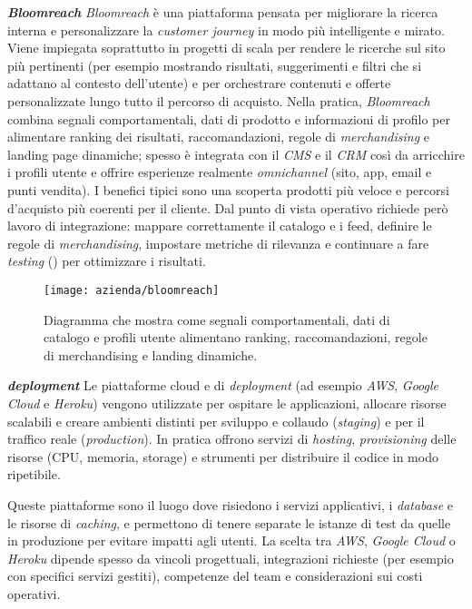 \medskip
\noindent\textbf{\emph{Bloomreach}}
\emph{Bloomreach} è una piattaforma pensata per migliorare la ricerca interna e personalizzare la \emph{customer journey} in modo più intelligente e mirato. 
Viene impiegata soprattutto in progetti di scala per rendere le ricerche sul sito più pertinenti (per esempio mostrando risultati, suggerimenti e filtri che si adattano al contesto dell’utente) 
e per orchestrare contenuti e offerte personalizzate lungo tutto il percorso di acquisto.
Nella pratica, \emph{Bloomreach} combina segnali comportamentali, dati di prodotto e informazioni di profilo per alimentare ranking dei risultati, raccomandazioni, 
regole di \emph{merchandising} e landing page dinamiche; spesso è integrata con il \emph{CMS} e il \emph{CRM} così da arricchire i profili utente e offrire esperienze 
realmente \emph{omnichannel} (sito, app, email e punti vendita).
I benefici tipici sono una scoperta prodotti più veloce e percorsi d’acquisto più coerenti per il cliente. Dal punto di vista operativo 
richiede però lavoro di integrazione: mappare correttamente il catalogo e i feed, definire le regole di \emph{merchandising}, impostare metriche di rilevanza e 
continuare a fare \emph{testing} () per ottimizzare i risultati.

\begin{figure}[htbp]
    \centering
    \texttt{[image: azienda/bloomreach]}
    \caption{Diagramma che mostra come segnali comportamentali, dati di catalogo e profili utente alimentano ranking, raccomandazioni, regole di merchandising e landing dinamiche.}
    \label{fig:bloomreach}
\end{figure}

\medskip
\noindent\textbf{\emph{deployment}}
Le piattaforme cloud e di \emph{deployment} (ad esempio \emph{AWS}, \emph{Google Cloud} e \emph{Heroku}) vengono utilizzate per ospitare le applicazioni, 
allocare risorse scalabili e creare ambienti distinti per sviluppo e collaudo (\emph{staging}) e per il traffico reale (\emph{production}). 
In pratica offrono servizi di \emph{hosting}, \emph{provisioning} delle risorse (CPU, memoria, storage) e strumenti per distribuire il codice in modo ripetibile.

Queste piattaforme sono il luogo dove risiedono i servizi applicativi, i \emph{database} e le risorse di \emph{caching}, 
e permettono di tenere separate le istanze di test da quelle in produzione per evitare impatti agli utenti. La scelta tra \emph{AWS}, \emph{Google Cloud} o \emph{Heroku} 
dipende spesso da vincoli progettuali, integrazioni richieste (per esempio con specifici servizi gestiti), competenze del team e considerazioni sui costi operativi.

